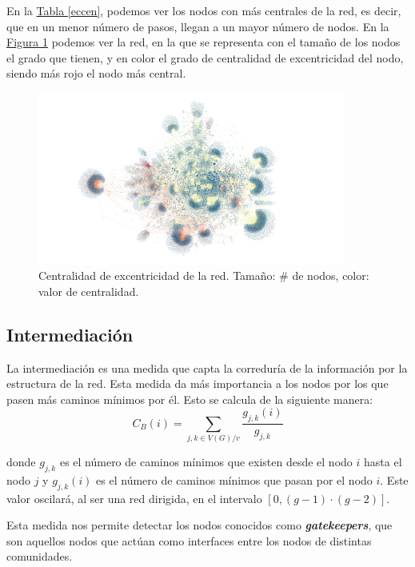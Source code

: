 \documentclass[paper=a4, fontsize=11pt]{article} %
\numberwithin{equation}{section} %
\numberwithin{figure}{section} %
\numberwithin{table}{section} %
\begin{document}
En la \hyperref[eccen]{Tabla \ref*{eccen}}, podemos ver los nodos con más centrales de la red, es decir, que en un menor número de pasos, llegan a un mayor número de nodos. En la \hyperref[im4]{Figura \ref*{im8}} podemos ver la red, en la que se representa con el tamaño de los nodos el grado que tienen, y en color el grado de centralidad de excentricidad del nodo, siendo más rojo el nodo más central.

\begin{figure}[H]
  \centering
  \includegraphics[width=0.9\textwidth]{eccen}
  \caption{Centralidad de excentricidad de la red. Tamaño: \# de nodos, color: valor de centralidad.}
  \label{im8}
\end{figure}

\subsection{Intermediación}

La intermediación es una medida que capta la correduría de la información por la estructura de la red. Esta medida da más importancia a los nodos por los que pasen más caminos mínimos por él. Esto se calcula de la siguiente manera:
\begin{displaymath}
  C_B(i) = \sum_{j, k \in V(G)/v}\frac{g_{j,k}(i)}{g_{j,k}}
\end{displaymath}

donde $g_{j,k}$ es el número de caminos mínimos que existen desde el nodo $i$ hasta el nodo $j$ y $g_{j,k}(i)$ es el número de caminos mínimos que pasan por el nodo $i$. Este valor oscilará, al ser una red dirigida, en el intervalo $[0, (g-1)\cdot(g-2)]$.

Esta medida nos permite detectar los nodos conocidos como \textit{\textbf{gatekeepers}}, que son aquellos nodos que actúan como interfaces entre los nodos de distintas comunidades.
\end{document}
